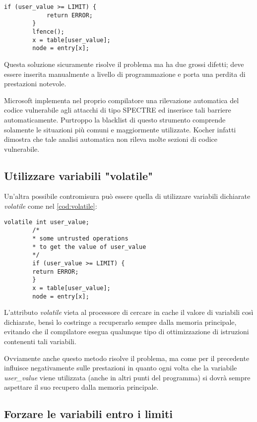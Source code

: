 		\begin{lstlisting}[caption={utilizzo di lfence},label={list:lfence}]
		if (user_value >= LIMIT) {
			return ERROR;
		} 
		lfence(); 
		x = table[user_value]; 
		node = entry[x];
		\end{lstlisting} 
		
		Questa soluzione sicuramente risolve il problema ma ha due grossi difetti; deve essere inserita manualmente a livello di programmazione e porta una perdita di prestazioni notevole\cite{AMD2018speculation}.
		
		Microsoft implementa nel proprio compilatore una rilevazione automatica del codice vulnerabile agli attacchi di tipo SPECTRE ed inserisce tali barriere automaticamente. Purtroppo la blacklist di questo strumento comprende solamente le situazioni più comuni e maggiormente utilizzate. Kocher infatti dimostra che tale analisi automatica non rileva molte sezioni di codice vulnerabile\cite{kocher2018mitigation}.
		
		\subsection*{Utilizzare variabili "volatile"}
		
		Un'altra possibile contromisura può essere quella di utilizzare variabili dichiarate \emph{volatile} come nel \cref{cod:volatile}:
		
		\begin{lstlisting}[caption={utilizzo di variabili dichiarate volatile},label={cod:volatile}]
		volatile int user_value;
		/*
		* some untrusted operations 
		* to get the value of user_value
		*/
		if (user_value >= LIMIT) {
		return ERROR;
		} 
		x = table[user_value]; 
		node = entry[x];
		\end{lstlisting}
		
		L'attributo \emph{volatile} vieta al processore di cercare in cache il valore di variabili così dichiarate, bensì lo costringe a recuperarlo sempre dalla memoria principale, evitando che il compilatore esegua qualunque tipo di ottimizzazione di istruzioni contenenti tali variabili.
				
		Ovviamente anche questo metodo risolve il problema, ma come per il precedente influisce negativamente sulle prestazioni in quanto ogni volta che la variabile \emph{user\_value} viene utilizzata (anche in altri punti del programma) si dovrà sempre aspettare il suo recupero dalla memoria principale.
		
		\subsection*{Forzare le variabili entro i limiti}
		
